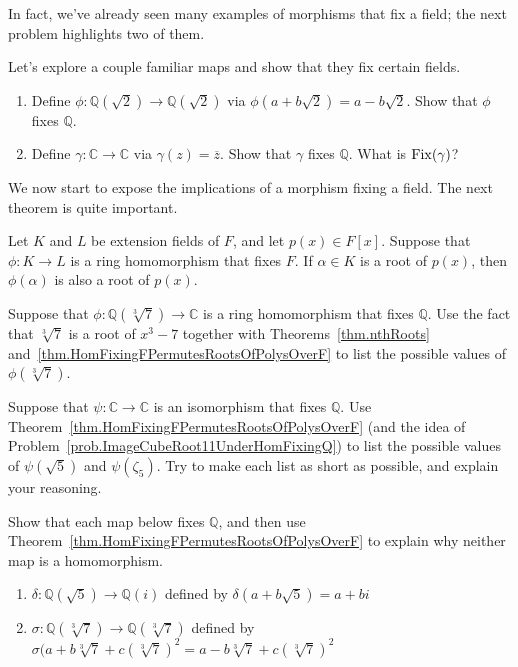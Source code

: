 In fact, we've already seen many examples of morphisms that fix a field; the next problem highlights two of them.

\begin{problem}\label{prob.FixedFieldofIsos}
Let's explore a couple familiar maps and show that they fix certain fields.
\begin{enumerate}
\item Define $\phi:\mathbb{Q}(\sqrt{2})\rightarrow\mathbb{Q}(\sqrt{2})$ via $\phi(a+b\sqrt{2}) = a-b\sqrt{2}$. Show that $\phi$ fixes  $\mathbb{Q}$.
\item Define $\gamma:\mathbb{C}\rightarrow\mathbb{C}$ via $\gamma(z) = \overline{z}$. Show that $\gamma$ fixes  $\mathbb{Q}$. What is $\operatorname{Fix}(\gamma)$?
\end{enumerate}
\end{problem}

We now start to expose the implications of a morphism fixing a field. The next theorem is quite important.

\begin{theorem}\label{thm.HomFixingFPermutesRootsOfPolysOverF}
Let $K$ and $L$ be extension fields of $F$, and let $p(x)\in F[x]$. Suppose that $\phi:K\to L$ is a ring homomorphism that fixes $F$. If $\alpha\in K$ is a root of $p(x)$, then $\phi(\alpha)$ is also a root of $p(x)$. 
\end{theorem}

\begin{problem}\label{prob.ImageCubeRoot11UnderHomFixingQ}
Suppose that $\phi:\mathbb{Q}(\sqrt[3]{7})\rightarrow\mathbb{C}$ is a ring homomorphism that fixes $\mathbb{Q}$. Use the fact that $\sqrt[3]{7}$ is a root of $x^3 - 7$ together with Theorems~\ref{thm.nthRoots} and~\ref{thm.HomFixingFPermutesRootsOfPolysOverF} to list the possible values of $\phi(\sqrt[3]{7})$.
\end{problem}	

\begin{problem}
Suppose that $\psi:\mathbb{C}\to \mathbb{C}$ is an isomorphism that fixes $\mathbb{Q}$. Use Theorem~\ref{thm.HomFixingFPermutesRootsOfPolysOverF} (and the idea of Problem~\ref{prob.ImageCubeRoot11UnderHomFixingQ}) to list the possible values of $\psi(\sqrt{5})$ and $\psi(\zeta_5)$. Try to make each list as short as possible, and explain your reasoning.
\end{problem}

\begin{problem}
Show that each map below fixes $\mathbb{Q}$, and then use Theorem~\ref{thm.HomFixingFPermutesRootsOfPolysOverF} to explain why neither map is a homomorphism.
\begin{enumerate}
\item $\delta:\mathbb{Q}(\sqrt{5})\rightarrow\mathbb{Q}(i)$ defined by $\delta(a+b\sqrt{5}) = a+ b i$
\item $\sigma:\mathbb{Q}(\sqrt[3]{7})\rightarrow\mathbb{Q}(\sqrt[3]{7})$ defined by $\sigma(a+b\sqrt[3]{7} + c (\sqrt[3]{7})^2 = a-b\sqrt[3]{7} + c (\sqrt[3]{7})^2$
\end{enumerate}
\end{problem}

